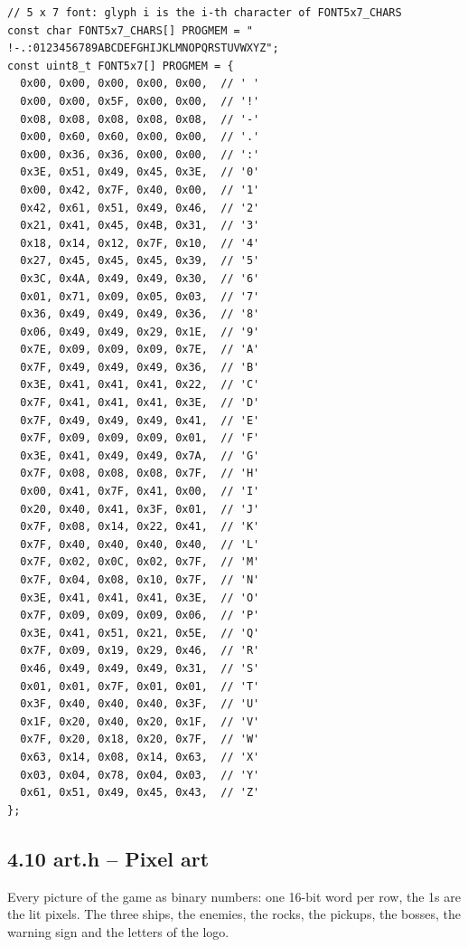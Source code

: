 \documentclass[11pt,a4paper]{article}
\begin{document}
\begin{lstlisting}[language=Arduino]
// 5 x 7 font: glyph i is the i-th character of FONT5x7_CHARS
const char FONT5x7_CHARS[] PROGMEM = " !-.:0123456789ABCDEFGHIJKLMNOPQRSTUVWXYZ";
const uint8_t FONT5x7[] PROGMEM = {
  0x00, 0x00, 0x00, 0x00, 0x00,  // ' '
  0x00, 0x00, 0x5F, 0x00, 0x00,  // '!'
  0x08, 0x08, 0x08, 0x08, 0x08,  // '-'
  0x00, 0x60, 0x60, 0x00, 0x00,  // '.'
  0x00, 0x36, 0x36, 0x00, 0x00,  // ':'
  0x3E, 0x51, 0x49, 0x45, 0x3E,  // '0'
  0x00, 0x42, 0x7F, 0x40, 0x00,  // '1'
  0x42, 0x61, 0x51, 0x49, 0x46,  // '2'
  0x21, 0x41, 0x45, 0x4B, 0x31,  // '3'
  0x18, 0x14, 0x12, 0x7F, 0x10,  // '4'
  0x27, 0x45, 0x45, 0x45, 0x39,  // '5'
  0x3C, 0x4A, 0x49, 0x49, 0x30,  // '6'
  0x01, 0x71, 0x09, 0x05, 0x03,  // '7'
  0x36, 0x49, 0x49, 0x49, 0x36,  // '8'
  0x06, 0x49, 0x49, 0x29, 0x1E,  // '9'
  0x7E, 0x09, 0x09, 0x09, 0x7E,  // 'A'
  0x7F, 0x49, 0x49, 0x49, 0x36,  // 'B'
  0x3E, 0x41, 0x41, 0x41, 0x22,  // 'C'
  0x7F, 0x41, 0x41, 0x41, 0x3E,  // 'D'
  0x7F, 0x49, 0x49, 0x49, 0x41,  // 'E'
  0x7F, 0x09, 0x09, 0x09, 0x01,  // 'F'
  0x3E, 0x41, 0x49, 0x49, 0x7A,  // 'G'
  0x7F, 0x08, 0x08, 0x08, 0x7F,  // 'H'
  0x00, 0x41, 0x7F, 0x41, 0x00,  // 'I'
  0x20, 0x40, 0x41, 0x3F, 0x01,  // 'J'
  0x7F, 0x08, 0x14, 0x22, 0x41,  // 'K'
  0x7F, 0x40, 0x40, 0x40, 0x40,  // 'L'
  0x7F, 0x02, 0x0C, 0x02, 0x7F,  // 'M'
  0x7F, 0x04, 0x08, 0x10, 0x7F,  // 'N'
  0x3E, 0x41, 0x41, 0x41, 0x3E,  // 'O'
  0x7F, 0x09, 0x09, 0x09, 0x06,  // 'P'
  0x3E, 0x41, 0x51, 0x21, 0x5E,  // 'Q'
  0x7F, 0x09, 0x19, 0x29, 0x46,  // 'R'
  0x46, 0x49, 0x49, 0x49, 0x31,  // 'S'
  0x01, 0x01, 0x7F, 0x01, 0x01,  // 'T'
  0x3F, 0x40, 0x40, 0x40, 0x3F,  // 'U'
  0x1F, 0x20, 0x40, 0x20, 0x1F,  // 'V'
  0x7F, 0x20, 0x18, 0x20, 0x7F,  // 'W'
  0x63, 0x14, 0x08, 0x14, 0x63,  // 'X'
  0x03, 0x04, 0x78, 0x04, 0x03,  // 'Y'
  0x61, 0x51, 0x49, 0x45, 0x43,  // 'Z'
};
\end{lstlisting}

\clearpage
\subsection*{4.10 art.h – Pixel art}
Every picture of the game as binary numbers: one 16-bit word per row, the 1s are the lit pixels. The three ships, the enemies, the rocks, the pickups, the bosses, the warning sign and the letters of the logo.
\end{document}
